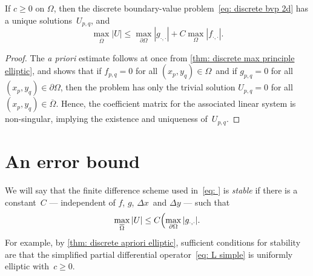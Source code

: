 \begin{theorem}\label{thm: discrete apriori elliptic}
If $c\ge0$ on $\Omega$, then the discrete boundary-value 
problem~\eqref{eq: discrete bvp 2d} has a unique solutions~$U_{p,q}$, and
\[
\max_{\overline{\Omega}}|U|\le\max_{\partial\Omega}|g_{\cdot,\cdot}|
	+C\max_\Omega|f_{\cdot,\cdot}|.
\]
\end{theorem}
\begin{proof}
The \emph{a priori} estimate follows at once from 
\cref{thm: discrete max principle elliptic}, and shows that if $f_{p,q}=0$
for all $(x_p,y_q)\in\Omega$~and if $g_{p,q}=0$ for all 
$(x_p,y_q)\in\partial\Omega$, then the problem has only the trivial solution
$U_{p,q}=0$ for all $(x_p,y_q)\in\overline{\Omega}$. Hence, the coefficient
matrix for the associated linear system is non-singular, implying the
existence and uniqueness of~$U_{p,q}$.
\end{proof}

\section{An error bound}

We will say that the finite difference scheme used in~\eqref{eq: }
is \emph{stable} if there is a constant~$C$ --- independent of $f$, $g$,
$\Delta x$~and $\Delta y$ --- such that
\begin{equation}\label{eq: stability elliptic Omega}
\max_{\overline{\Omega}}|U|\le C\Bigl(\max_{\partial\Omega}|g_{\cdot,\cdot}|.
\end{equation}
For example, by \cref{thm: discrete apriori elliptic}, sufficient conditions
for stability are that the simplified partial differential 
operator~\eqref{eq: L simple} is uniformly elliptic with~$c\ge0$.  

